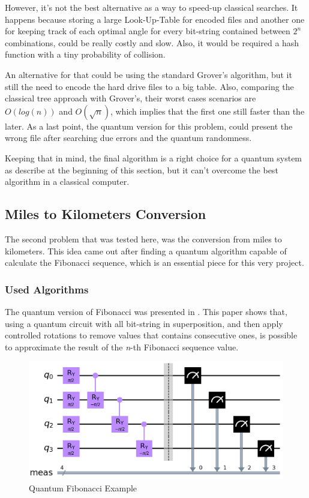 \documentclass{article}
\makeatletter
\renewcommand\subsubsubsection{\@startsection{paragraph}{4}{\z@}{-2.5ex\@plus -1ex \@minus -.25ex}{1.25ex \@plus .25ex}{\normalfont\normalsize\bfseries}}
\makeatother
\begin{document}
However, it's not the best alternative as a way to speed-up classical searches. It happens because storing a large Look-Up-Table for encoded files and another one for keeping track of each optimal angle for every bit-string contained between $2^n$ combinations, could be really costly and slow. Also, it would be required a hash function with a tiny probability of collision.

An alternative for that could be using the standard Grover's algorithm, but it still the need to encode the hard drive files to a big table. Also, comparing the classical tree approach with Grover's, their worst cases scenarios are $O(log(n))$ and $O(\sqrt{n})$, which implies that the first one still faster than the later. As a last point, the quantum version for this problem, could present the wrong file after searching due errors and the quantum randomness.

Keeping that in mind, the final algorithm is a right choice for a quantum system as describe at the beginning of this section, but it can't overcome the best algorithm in a classical computer. 



\subsection{Miles to Kilometers Conversion} \label{conversion}

The second problem that was tested here, was the conversion from miles to kilometers. This idea came out after finding a quantum algorithm capable of calculate the Fibonacci sequence, which is an essential piece for this very project.
 
\subsubsection{Used Algorithms}

\subsubsubsection{Quantum Fibonacci}

The quantum version of Fibonacci was presented in \cite{gilliam2020canonical}. This paper shows that, using a quantum circuit with all bit-string in superposition, and then apply  controlled rotations to remove values that contains consecutive ones, is possible to approximate the result of the \textit{n}-th Fibonacci sequence value.

\newpage


\begin{figure}
	\centering
	\includegraphics[scale=0.3]{fibonacci-circuit.png}
	\caption{Quantum Fibonacci Example}
	\label{fig:fibonacci-circuit}
\end{figure}
\end{document}
